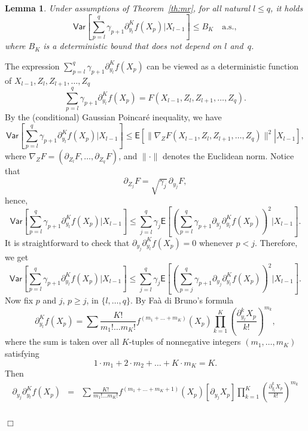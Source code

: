 \documentclass[preprint]{imsart}
\newcommand{\proofendsign}{$\Box$}
\newtheorem{lem}[thm]{Lemma}
\newenvironment{proof}{{\noindent \bf Proof }}
 {{\hspace*{\fill}\proofendsign\par\bigskip}}
\begin{document}
\begin{lem}
\label{lem:var_poincare}
Under assumptions of Theorem~\ref{th:mr},
for all natural $l\le q$, it holds
$$
\mathsf{Var}\left[\sum_{p=l}^{q}\gamma_{p+1}\partial_{y_{l}}^{K}f\left(X_{p}\right)\Big|X_{l-1}\right]\le B_K\quad\text{a.s.},
$$
where $B_K$ is a deterministic bound that does not depend on $l$ and~$q$.
\end{lem}

\begin{proof}
The expression
$\sum_{p=l}^q \gamma_{p+1} \partial_{y_l}^K f(X_p)$
can be viewed as a deterministic function of
$X_{l-1},Z_l,Z_{l+1},\ldots,Z_q$
$$
\sum_{p=l}^q \gamma_{p+1} \partial_{y_l}^K f(X_p)
=F(X_{l-1},Z_l,Z_{l+1},\ldots,Z_q).
$$
By the (conditional) Gaussian Poincar\'e inequality,
we have
$$
\mathsf{Var}\left[\sum_{p=l}^{q}\gamma_{p+1}\partial_{y_{l}}^{K}f\left(X_{p}\right)\Big|X_{l-1}\right]
\le\mathsf E\left[\left.
\|\nabla_Z F(X_{l-1},Z_l,Z_{l+1},\ldots,Z_q)\|^2
\right|X_{l-1}\right],
$$
where $\nabla_Z F=(\partial_{Z_l} F,\ldots,\partial_{Z_q} F)$,
and $\|\cdot\|$ denotes the Euclidean norm.
Notice that
$$
\partial_{Z_j} F=\sqrt{\gamma_j}\,\partial_{y_j} F,
$$
hence,
$$
\mathsf{Var}\left[\sum_{p=l}^{q}\gamma_{p+1}\partial_{y_{l}}^{K}f\left(X_{p}\right)\Big|X_{l-1}\right]\leq\sum_{j=l}^{q}\gamma_{j}\mathsf{E}\left[\left(\sum_{p=l}^{q}\gamma_{p+1}\partial_{y_{j}}\partial_{y_{l}}^{K}f\left(X_{p}\right)\right)^{2}\Big|X_{l-1}\right].
$$
It is straightforward to check that
$\partial_{y_j}\partial_{y_l}^K f(X_p)=0$
whenever $p<j$. Therefore, we get
\begin{equation}\label{eq:10062018a2}
\mathsf{Var}\left[\sum_{p=l}^{q}\gamma_{p+1}\partial_{y_{l}}^{K}f\left(X_{p}\right)\Big|X_{l-1}\right]\leq\sum_{j=l}^{q}\gamma_{j}\mathsf{E}\left[\left(\sum_{p=j}^{q}\gamma_{p+1}\partial_{y_{j}}\partial_{y_{l}}^{K}f\left(X_{p}\right)\right)^{2}\Big|X_{l-1}\right].
\end{equation}
Now fix $p$ and $j$, $p\ge j$, in $\{l,\ldots,q\}$.
By Fa\`a di Bruno's formula
\[
\partial_{y_{l}}^{K}f\left(X_{p}\right)=\sum\frac{K!}{m_{1}!\ldots m_{K}!}f^{(m_{1}+\ldots+m_{K})}(X_{p})\prod_{k=1}^{K}\left(\frac{\partial_{y_{l}}^{k}X_{p}}{k!}\right)^{m_{k}},
\]
where the sum is taken over all $K$-tuples of nonnegative integers
$(m_1,\ldots,m_K)$ satisfying
$$
1\cdot m_{1}+2\cdot m_{2}+\ldots+K\cdot m_{K}=K.
$$
Then
\begin{eqnarray*}
\partial_{y_{j}}\partial_{y_{l}}^{K}f\left(X_{p}\right)
&=&\sum\frac{K!}{m_{1}!\ldots m_{K}!}f^{(m_{1}+\ldots+m_{K}+1)}(X_{p})\left[\partial_{y_{j}}X_{p}\right]\prod_{k=1}^{K}\left(\frac{\partial_{y_{l}}^{k}X_{p}}{k!}\right)^{m_{k}} \\

\end{eqnarray*}
\end{proof}
\end{document}
